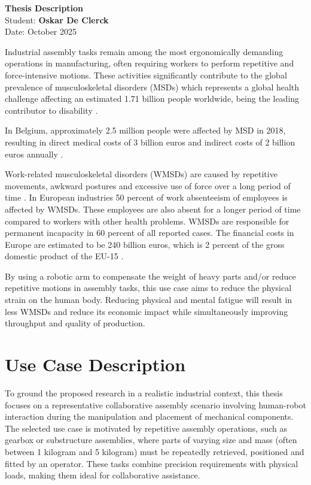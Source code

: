 \documentclass[11pt,a4paper]{article}
\begin{document}
\begin{center}
    \Large\textbf{Thesis Description}\\
    \vspace{4mm}
    \normalsize Student: \textbf{Oskar De Clerck} \\
    Date: October 2025
\end{center}

\vspace{6mm}

Industrial assembly tasks remain among the most ergonomically demanding operations in manufacturing, often requiring workers to perform repetitive and force-intensive motions. These activities significantly contribute to the global prevalence of musculoskeletal disorders (MSDs) which represents a global health challenge affecting an estimated 1.71 billion people worldwide, being the leading contributor to disability \cite{WHO_musculoskeletal}.

In Belgium, approximately 2.5 million people were affected by MSD in 2018, resulting in direct medical costs of 3 billion euros and indirect costs of 2 billion euros annually \cite{Gorasso2023}.

Work-related musculoskeletal disorders (WMSDs) are caused by repetitive movements, awkward postures and excessive use of force over a long period of time \cite{EUOSHA_MSD}. In European industries 50 percent of work absenteeism of employees is affected by WMSDs. These employees are also absent for a longer period of time compared to workers with other health problems. WMSDs are responsible for permanent incapacity in 60 percent of all reported cases. The financial costs in Europe are estimated to be 240 billion euros, which is 2 percent of the gross domestic product of the EU-15 \cite{EEA_EU15} \cite{Govaerts2021WMSD}.

By using a robotic arm to compensate the weight of heavy parts and/or reduce repetitive motions in assembly tasks, this use case aims to reduce the physical strain on the human body. Reducing physical and mental fatigue will result in less WMSDs and reduce its economic impact while simultaneously improving throughput and quality of production. 

\section*{Use Case Description}
To ground the proposed research in a realistic industrial context, this thesis focuses on a representative collaborative assembly scenario involving human-robot interaction during the manipulation and placement of mechanical components. The selected use case is motivated by repetitive assembly operations, such as gearbox or substructure assemblies, where parts of varying size and mass (often between 1 kilogram and 5 kilogram) must be repeatedly retrieved, positioned and fitted by an operator. These tasks combine precision requirements with physical loads, making them ideal for collaborative assistance.
\end{document}
